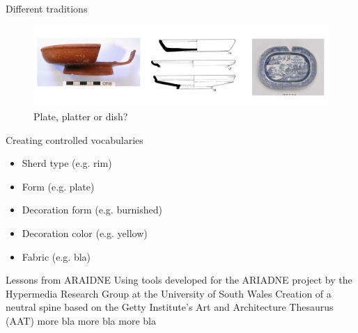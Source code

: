 \documentclass[xcolor=x11names, aspectratio=169,usenames,dvipsnames]{beamer}
\begin{document}
\begin{frame}{Different traditions}
\begin{center}
\begin{figure}
\includegraphics[width=\textwidth]{img/tim_plate_platter_dish.jpg}
\caption{Plate, platter or dish?}
\end{figure}
\end{center}
\end{frame}

\begin{frame}{Creating controlled vocabularies}
\begin{itemize}
\item Sherd type (e.g. rim)
\item Form (e.g. plate)
\item Decoration form (e.g. burnished)
\item Decoration color (e.g. yellow)
\item Fabric (e.g. bla)
\end{itemize}
\end{frame}

\begin{frame}{Lessons from ARAIDNE}
Using tools developed for the ARIADNE project by the Hypermedia Research Group at the University of South Wales \hfill{}\newline
Creation of a neutral spine based on the Getty Institute's Art and Architecture Thesaurus (AAT)\newline
more bla\newline
more bla\newline
more bla\newline
\end{frame}

\maketitle
\end{document}
